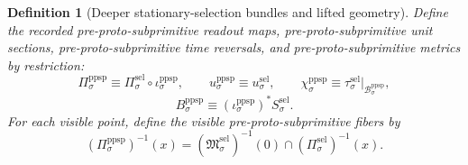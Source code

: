 \documentclass[11pt]{article}
\newcommand{\PreProtoSubprimSpace}[1]{\mathcal B_{#1}^{\mathrm{ppsp}}}
\newcommand{\PreProtoSubprimRead}[1]{\Pi_{#1}^{\mathrm{ppsp}}}
\newcommand{\PreProtoSubprimUnit}[1]{u_{#1}^{\mathrm{ppsp}}}
\newcommand{\PreProtoSubprimTimeRev}[1]{\chi_{#1}^{\mathrm{ppsp}}}
\newcommand{\PreProtoSubprimMetric}[1]{B_{#1}^{\mathrm{ppsp}}}
\newcommand{\PreProtoSubprimInc}[1]{\iota_{#1}^{\mathrm{ppsp}}}
\newcommand{\SelRead}[1]{\Pi_{#1}^{\mathrm{sel}}}
\newcommand{\SelUnit}[1]{u_{#1}^{\mathrm{sel}}}
\newcommand{\SelTimeRev}[1]{\tau_{#1}^{\mathrm{sel}}}
\newcommand{\SelMetric}[1]{S_{#1}^{\mathrm{sel}}}
\newcommand{\SelSection}[1]{\mathfrak M_{#1}^{\mathrm{sel}}}
\newtheorem{definition}{Definition}
\begin{document}
\begin{definition}[Deeper stationary-selection bundles and lifted geometry]
Define the recorded pre-proto-subprimitive readout maps, pre-proto-subprimitive unit sections, pre-proto-subprimitive time reversals, and pre-proto-subprimitive metrics by restriction:
\begin{equation}
\PreProtoSubprimRead{\sigma}\equiv \SelRead{\sigma}\circ\PreProtoSubprimInc{\sigma},
\qquad
\PreProtoSubprimUnit{\sigma}\equiv \SelUnit{\sigma},
\qquad
\PreProtoSubprimTimeRev{\sigma}\equiv \SelTimeRev{\sigma}|_{\PreProtoSubprimSpace{\sigma}},
\label{eq:preproto_basic_structure_from_selection}
\end{equation}
\begin{equation}
\PreProtoSubprimMetric{\sigma}\equiv (\PreProtoSubprimInc{\sigma})^*\SelMetric{\sigma}.
\label{eq:preproto_metric_from_selection}
\end{equation}
For each visible point, define the visible pre-proto-subprimitive fibers by
\begin{equation}
(\PreProtoSubprimRead{\sigma})^{-1}(x)
=
\left(\SelSection{\sigma}\right)^{-1}(0)\cap(\SelRead{\sigma})^{-1}(x).
\label{eq:preproto_fiber_from_selection}
\end{equation}
\end{definition}
\end{document}
